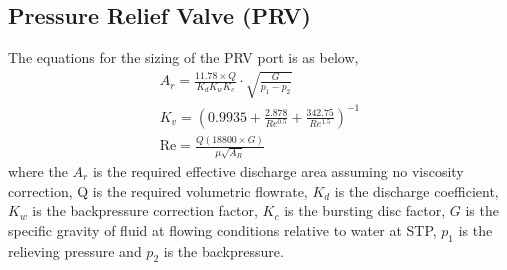 \subsection{Pressure Relief Valve (PRV)}
\label{app:PRV}
The equations for the sizing of the PRV port is as below,
\begin{align}
    A_r = \frac{11.78 \times Q}{K_d K_w K_c} \cdot \sqrt{\frac{G}{p_1-p_2}} \\
    K_v = (0.9935 + \frac{2.878}{Re^{0.5}} + \frac{342.75}{Re^{1.5}})^{-1} \\
    \mathrm{Re} = \frac{Q(18800 \times G)}{\mu \sqrt{A_R}}
\end{align}
where the $A_r$ is the required effective discharge area assuming no viscosity correction, Q is the required volumetric flowrate, $K_d$ is the discharge coefficient, $K_w$ is the backpressure correction factor, $K_c$ is the bursting disc factor, $G$ is the specific gravity of fluid at flowing conditions relative to water at STP, $p_1$ is the relieving pressure and $p_2$ is the backpressure. 
